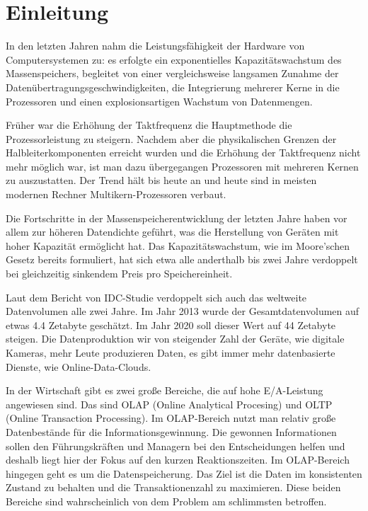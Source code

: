 
\section{Einleitung}
In den letzten Jahren nahm die Leistungsfähigkeit der Hardware von Computersystemen zu: es erfolgte ein exponentielles Kapazitätswachstum des Massenspeichers, begleitet von einer vergleichsweise langsamen Zunahme der Datenübertragungsgeschwindigkeiten, die Integrierung mehrerer Kerne in die Prozessoren und einen explosionsartigen Wachstum von Datenmengen.

Früher war die Erhöhung der Taktfrequenz die Hauptmethode die Prozessorleistung zu steigern. 
Nachdem aber die physikalischen Grenzen der Halbleiterkomponenten erreicht wurden und die Erhöhung der Taktfrequenz nicht mehr möglich war, ist man dazu übergegangen Prozessoren mit mehreren Kernen zu auszustatten. 
Der Trend hält bis heute an und heute sind in meisten modernen Rechner Multikern-Prozessoren verbaut.

Die Fortschritte in der Massenspeicherentwicklung der letzten Jahre haben vor allem zur höheren Datendichte geführt, was die Herstellung von Geräten mit hoher Kapazität ermöglicht hat. 
Das Kapazitätswachstum, wie im Moore'schen Gesetz bereits formuliert, hat sich etwa alle anderthalb bis zwei Jahre verdoppelt bei gleichzeitig sinkendem Preis pro Speichereinheit.

Laut dem Bericht von IDC-Studie \cite{idc} verdoppelt sich auch das weltweite Datenvolumen alle zwei Jahre. 
Im Jahr 2013 wurde der Gesamtdatenvolumen auf etwas 4.4 Zetabyte geschätzt. 
Im Jahr 2020 soll dieser Wert auf 44 Zetabyte steigen. Die Datenproduktion wir von steigender Zahl der Geräte, wie digitale Kameras, mehr Leute produzieren Daten, es gibt immer mehr datenbasierte Dienste, wie Online-Data-Clouds.

In der Wirtschaft gibt es zwei große Bereiche, die auf hohe E/A-Leistung angewiesen sind. 
Das sind OLAP (Online Analytical Procesing) und OLTP (Online Transaction Processing). 
Im OLAP-Bereich nutzt man relativ große Datenbestände für die Informationsgewinnung. 
Die gewonnen Informationen sollen den Führungskräften und Managern bei den Entscheidungen helfen und deshalb liegt hier der Fokus auf den kurzen Reaktionszeiten. 
Im OLAP-Bereich hingegen geht es um die Datenspeicherung. 
Das Ziel ist die Daten im konsistenten Zustand zu behalten und die Transaktionenzahl zu maximieren.
Diese beiden Bereiche sind wahrscheinlich von dem Problem am schlimmsten betroffen.

